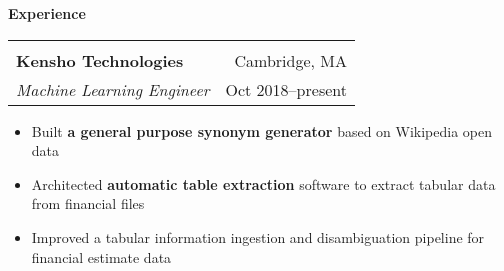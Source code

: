 \documentclass[letterpaper,11pt,oneside]{article}
\begin{document}
 \vspace{-0.35cm}
 \raggedright
 \textbf{\Large{Experience}} \sout{\hfill} \\
 \normalsize
\begin{flushleft}
 \vspace{-0.45cm}
 \begin{tabular}{@{} l r@{} }
    \hspace{0.78\linewidth} & \hspace{0.2\linewidth} \\
    \textbf{Kensho Technologies} & Cambridge, MA \\ 
    \textit{Machine Learning Engineer} & Oct 2018--present \\ 
 \end{tabular}
 \end{flushleft}
 \begin{flushleft}
 \begin{small}
 \begin{itemize}[leftmargin=*]
 \item Built \textbf{a general purpose synonym generator} based on Wikipedia open data
 \item Architected \textbf{automatic table extraction} software to extract tabular data from financial files
 \item Improved a tabular information ingestion and disambiguation pipeline for financial estimate data
 \end{itemize}
 \end{small}
 \end{flushleft}
\end{document}
